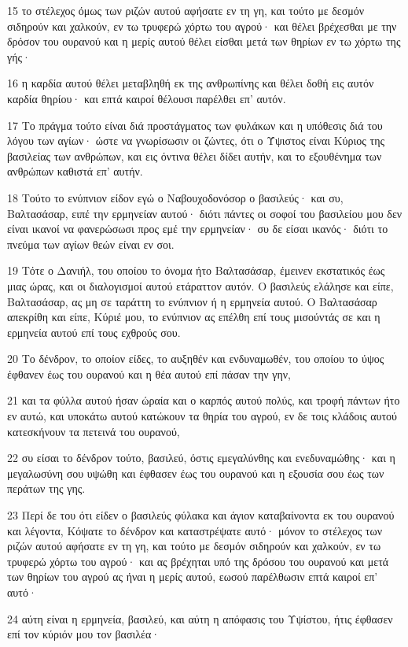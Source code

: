 \par 15 το στέλεχος όμως των ριζών αυτού αφήσατε εν τη γη, και τούτο με δεσμόν σιδηρούν και χαλκούν, εν τω τρυφερώ χόρτω του αγρού· και θέλει βρέχεσθαι με την δρόσον του ουρανού και η μερίς αυτού θέλει είσθαι μετά των θηρίων εν τω χόρτω της γής·
\par 16 η καρδία αυτού θέλει μεταβληθή εκ της ανθρωπίνης και θέλει δοθή εις αυτόν καρδία θηρίου· και επτά καιροί θέλουσι παρέλθει επ' αυτόν.
\par 17 Το πράγμα τούτο είναι διά προστάγματος των φυλάκων και η υπόθεσις διά του λόγου των αγίων· ώστε να γνωρίσωσιν οι ζώντες, ότι ο Ύψιστος είναι Κύριος της βασιλείας των ανθρώπων, και εις όντινα θέλει δίδει αυτήν, και το εξουθένημα των ανθρώπων καθιστά επ' αυτήν.
\par 18 Τούτο το ενύπνιον είδον εγώ ο Ναβουχοδονόσορ ο βασιλεύς· και συ, Βαλτασάσαρ, ειπέ την ερμηνείαν αυτού· διότι πάντες οι σοφοί του βασιλείου μου δεν είναι ικανοί να φανερώσωσι προς εμέ την ερμηνείαν· συ δε είσαι ικανός· διότι το πνεύμα των αγίων θεών είναι εν σοι.
\par 19 Τότε ο Δανιήλ, του οποίου το όνομα ήτο Βαλτασάσαρ, έμεινεν εκστατικός έως μιας ώρας, και οι διαλογισμοί αυτού ετάραττον αυτόν. Ο βασιλεύς ελάλησε και είπε, Βαλτασάσαρ, ας μη σε ταράττη το ενύπνιον ή η ερμηνεία αυτού. Ο Βαλτασάσαρ απεκρίθη και είπε, Κύριέ μου, το ενύπνιον ας επέλθη επί τους μισούντάς σε και η ερμηνεία αυτού επί τους εχθρούς σου.
\par 20 Το δένδρον, το οποίον είδες, το αυξηθέν και ενδυναμωθέν, του οποίου το ύψος έφθανεν έως του ουρανού και η θέα αυτού επί πάσαν την γην,
\par 21 και τα φύλλα αυτού ήσαν ώραία και ο καρπός αυτού πολύς, και τροφή πάντων ήτο εν αυτώ, και υποκάτω αυτού κατώκουν τα θηρία του αγρού, εν δε τοις κλάδοις αυτού κατεσκήνουν τα πετεινά του ουρανού,
\par 22 συ είσαι το δένδρον τούτο, βασιλεύ, όστις εμεγαλύνθης και ενεδυναμώθης· και η μεγαλωσύνη σου υψώθη και έφθασεν έως του ουρανού και η εξουσία σου έως των περάτων της γης.
\par 23 Περί δε του ότι είδεν ο βασιλεύς φύλακα και άγιον καταβαίνοντα εκ του ουρανού και λέγοντα, Κόψατε το δένδρον και καταστρέψατε αυτό· μόνον το στέλεχος των ριζών αυτού αφήσατε εν τη γη, και τούτο με δεσμόν σιδηρούν και χαλκούν, εν τω τρυφερώ χόρτω του αγρού· και ας βρέχηται υπό της δρόσου του ουρανού και μετά των θηρίων του αγρού ας ήναι η μερίς αυτού, εωσού παρέλθωσιν επτά καιροί επ' αυτό·
\par 24 αύτη είναι η ερμηνεία, βασιλεύ, και αύτη η απόφασις του Υψίστου, ήτις έφθασεν επί τον κύριόν μου τον βασιλέα·
